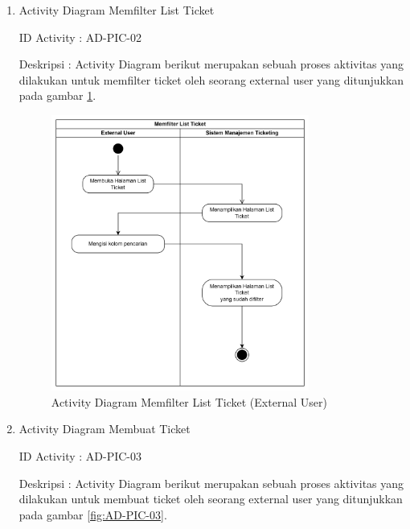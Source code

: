 \documentclass[12pt]{article}
\begin{document}
\begin{enumerate}[label=\textbf{4.\arabic*.}]
\begin{enumerate} [label=\textbf{4.2.\arabic*.}, wide, labelwidth=!, labelindent=0pt]
\begin{enumerate}[label=\textbf{4.2.1.\arabic*.}, wide, labelwidth=!, labelindent=0pt]
\begin{enumerate}[label=\arabic*.]
                \item Activity Diagram Memfilter List Ticket

                \noindent ID Activity	: AD-PIC-02

                \noindent Deskripsi	: Activity Diagram berikut merupakan sebuah proses aktivitas yang dilakukan untuk memfilter ticket oleh seorang external user yang ditunjukkan pada gambar \ref{fig:AD-PIC-02}.


                \begin{figure}[H]
                    \centering \includegraphics[width=0.8\textwidth]{images/activity/ex/Memfilter List Ticket.png}
                    \caption{Activity Diagram Memfilter List Ticket (External User)}
                    \label{fig:AD-PIC-02}
                \end{figure}

                \item Activity Diagram Membuat Ticket

                \noindent ID Activity	: AD-PIC-03

                \noindent Deskripsi	: Activity Diagram berikut merupakan sebuah proses aktivitas yang dilakukan untuk membuat ticket oleh seorang external user yang ditunjukkan pada gambar \ref{fig:AD-PIC-03}.



\end{enumerate}
\end{enumerate}
\end{enumerate}
\end{enumerate}
\end{document}
